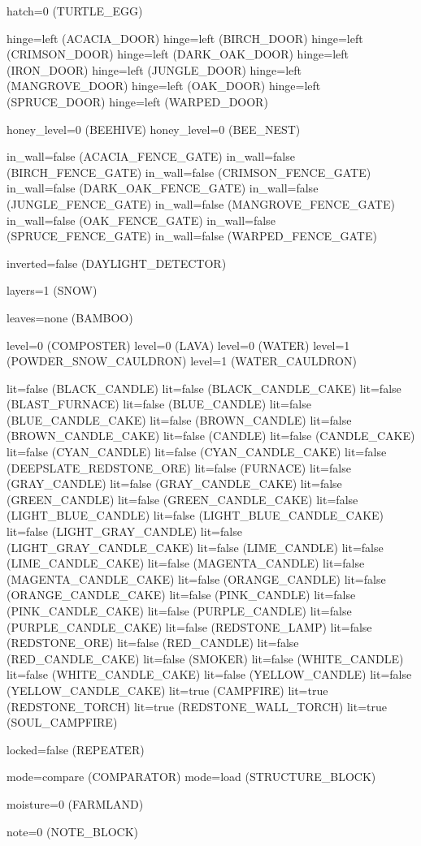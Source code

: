 \documentclass[11pt]{article}
\begin{document}
hatch=0 (TURTLE_EGG)

hinge=left (ACACIA_DOOR)
hinge=left (BIRCH_DOOR)
hinge=left (CRIMSON_DOOR)
hinge=left (DARK_OAK_DOOR)
hinge=left (IRON_DOOR)
hinge=left (JUNGLE_DOOR)
hinge=left (MANGROVE_DOOR)
hinge=left (OAK_DOOR)
hinge=left (SPRUCE_DOOR)
hinge=left (WARPED_DOOR)

honey_level=0 (BEEHIVE)
honey_level=0 (BEE_NEST)

in_wall=false (ACACIA_FENCE_GATE)
in_wall=false (BIRCH_FENCE_GATE)
in_wall=false (CRIMSON_FENCE_GATE)
in_wall=false (DARK_OAK_FENCE_GATE)
in_wall=false (JUNGLE_FENCE_GATE)
in_wall=false (MANGROVE_FENCE_GATE)
in_wall=false (OAK_FENCE_GATE)
in_wall=false (SPRUCE_FENCE_GATE)
in_wall=false (WARPED_FENCE_GATE)

inverted=false (DAYLIGHT_DETECTOR)

layers=1 (SNOW)

leaves=none (BAMBOO)

level=0 (COMPOSTER)
level=0 (LAVA)
level=0 (WATER)
level=1 (POWDER_SNOW_CAULDRON)
level=1 (WATER_CAULDRON)

lit=false (BLACK_CANDLE)
lit=false (BLACK_CANDLE_CAKE)
lit=false (BLAST_FURNACE)
lit=false (BLUE_CANDLE)
lit=false (BLUE_CANDLE_CAKE)
lit=false (BROWN_CANDLE)
lit=false (BROWN_CANDLE_CAKE)
lit=false (CANDLE)
lit=false (CANDLE_CAKE)
lit=false (CYAN_CANDLE)
lit=false (CYAN_CANDLE_CAKE)
lit=false (DEEPSLATE_REDSTONE_ORE)
lit=false (FURNACE)
lit=false (GRAY_CANDLE)
lit=false (GRAY_CANDLE_CAKE)
lit=false (GREEN_CANDLE)
lit=false (GREEN_CANDLE_CAKE)
lit=false (LIGHT_BLUE_CANDLE)
lit=false (LIGHT_BLUE_CANDLE_CAKE)
lit=false (LIGHT_GRAY_CANDLE)
lit=false (LIGHT_GRAY_CANDLE_CAKE)
lit=false (LIME_CANDLE)
lit=false (LIME_CANDLE_CAKE)
lit=false (MAGENTA_CANDLE)
lit=false (MAGENTA_CANDLE_CAKE)
lit=false (ORANGE_CANDLE)
lit=false (ORANGE_CANDLE_CAKE)
lit=false (PINK_CANDLE)
lit=false (PINK_CANDLE_CAKE)
lit=false (PURPLE_CANDLE)
lit=false (PURPLE_CANDLE_CAKE)
lit=false (REDSTONE_LAMP)
lit=false (REDSTONE_ORE)
lit=false (RED_CANDLE)
lit=false (RED_CANDLE_CAKE)
lit=false (SMOKER)
lit=false (WHITE_CANDLE)
lit=false (WHITE_CANDLE_CAKE)
lit=false (YELLOW_CANDLE)
lit=false (YELLOW_CANDLE_CAKE)
lit=true (CAMPFIRE)
lit=true (REDSTONE_TORCH)
lit=true (REDSTONE_WALL_TORCH)
lit=true (SOUL_CAMPFIRE)

locked=false (REPEATER)

mode=compare (COMPARATOR)
mode=load (STRUCTURE_BLOCK)

moisture=0 (FARMLAND)

note=0 (NOTE_BLOCK)
\end{document}
